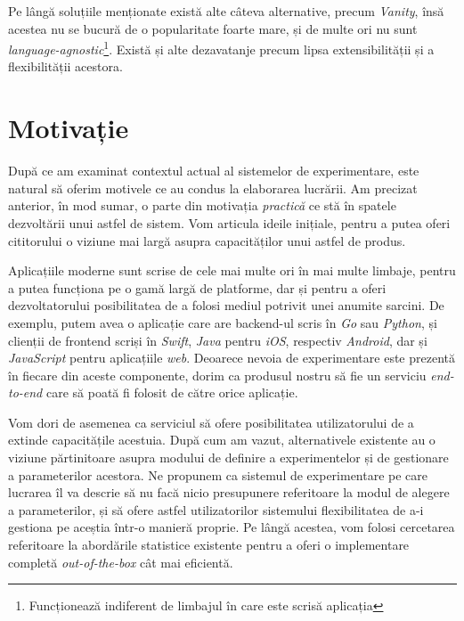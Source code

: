Pe lângă soluțiile menționate există alte câteva alternative, precum \textit{Vanity}, însă acestea nu se bucură de o popularitate foarte mare, și de multe ori nu sunt \textit{language-agnostic}\footnote{Funcționează indiferent de limbajul în care este scrisă aplicația}. Există și alte dezavatanje precum lipsa extensibilității și a flexibilității acestora.

\section{Motivație}

După ce am examinat contextul actual al sistemelor de experimentare, este natural să oferim motivele ce au condus la elaborarea lucrării. Am precizat anterior, în mod sumar, o parte din motivația \textit{practică} ce stă în spatele dezvoltării unui astfel de sistem. Vom articula ideile inițiale, pentru a putea oferi cititorului o viziune mai largă asupra capacităților unui astfel de produs.

Aplicațiile moderne sunt scrise de cele mai multe ori în mai multe limbaje, pentru a putea funcționa pe o gamă largă de platforme, dar și pentru a oferi dezvoltatorului posibilitatea de a folosi mediul potrivit unei anumite sarcini. De exemplu, putem avea o aplicație care are backend-ul scris în \textit{Go} sau \textit{Python}, și clienții de frontend scriși în \textit{Swift}, \textit{Java} pentru \textit{iOS}, respectiv \textit{Android}, dar și \textit{JavaScript} pentru aplicațiile \textit{web}. Deoarece nevoia de experimentare este prezentă în fiecare din aceste componente, dorim ca produsul nostru să fie un serviciu \textit{end-to-end} care să poată fi folosit de către orice aplicație. 

Vom dori de asemenea ca serviciul să ofere posibilitatea utilizatorului de a extinde capacitățile acestuia. După cum am vazut, alternativele existente au o viziune părtinitoare asupra modului de definire a experimentelor și de gestionare a parameterilor acestora. Ne propunem ca sistemul de experimentare pe care lucrarea îl va descrie să nu facă nicio presupunere referitoare la modul de alegere a parameterilor, și să ofere astfel utilizatorilor sistemului flexibilitatea de a-i gestiona pe aceștia într-o manieră proprie. Pe lângă acestea, vom folosi cercetarea referitoare la abordările statistice existente pentru a oferi o implementare completă \textit{out-of-the-box} cât mai eficientă.

